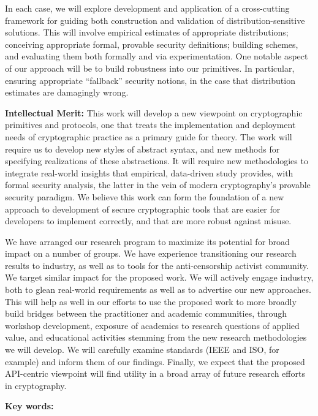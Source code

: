 \documentclass[11pt]{article}
\begin{document}
\smallskip
In each case, we will explore development and application of a cross-cutting 
framework for guiding both construction and validation of distribution-sensitive
solutions. This will involve empirical estimates of appropriate distributions; 
conceiving appropriate formal, provable security definitions; building schemes,
and evaluating them both formally and via experimentation.  One notable aspect of
our approach will be to build robustness into our primitives.  In particular,
ensuring appropriate ``fallback'' security notions, in the case that distribution estimates
are damagingly wrong.   %

\medskip 

\noindent \textbf{Intellectual Merit:} This work will develop a new
viewpoint on cryptographic primitives and protocols, one that treats the
implementation and deployment needs of cryptographic practice as a
primary guide for theory.  The work will require us to develop new styles of
abstract syntax, and new methods for specifying realizations of these
abstractions.  It will require new methodologies to integrate real-world insights that empirical,
data-driven study provides, with formal security analysis, the latter
in the vein of modern cryptography's provable security paradigm. 
We believe this work can form the foundation of a new approach to
development of secure cryptographic tools that are easier for
developers to implement correctly, and that are more robust against
misuse.  

\medskip

  We have arranged our research program to
maximize its potential for broad impact on a number of groups. We have
experience transitioning our research results to industry, as well as to tools for the anti-censorship
activist community. We target similar impact for the proposed
work. We will actively engage industry, both to glean real-world requirements
as well as to advertise our new approaches.  This will help as well in our efforts
to use the proposed work to more broadly build bridges between the practitioner
and academic communities, through workshop development, exposure of academics to 
research questions of applied value, and educational activities stemming from
the new research methodologies we will develop. We will carefully examine
standards (IEEE and ISO, for example) and inform them of our
findings. Finally, we expect that the proposed API-centric viewpoint will find utility in a broad array
of future research efforts in cryptography.

\vspace{1ex}
\noindent 
{\bf Key words:} 
\end{document}
